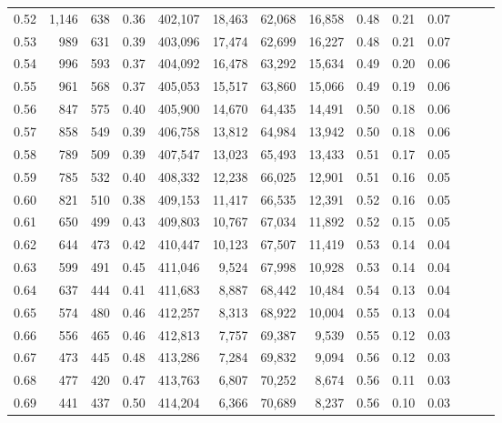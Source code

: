 \begin{tabular}{rrrrrrrrrrrrrr}
0.52 &   1,146 &    638 &  0.36 &  402,107 &   18,463 &  62,068 &  16,858 &  0.48 &  0.21 &      0.07 \\
0.53 &     989 &    631 &  0.39 &  403,096 &   17,474 &  62,699 &  16,227 &  0.48 &  0.21 &      0.07 \\
0.54 &     996 &    593 &  0.37 &  404,092 &   16,478 &  63,292 &  15,634 &  0.49 &  0.20 &      0.06 \\
0.55 &     961 &    568 &  0.37 &  405,053 &   15,517 &  63,860 &  15,066 &  0.49 &  0.19 &      0.06 \\
0.56 &     847 &    575 &  0.40 &  405,900 &   14,670 &  64,435 &  14,491 &  0.50 &  0.18 &      0.06 \\
0.57 &     858 &    549 &  0.39 &  406,758 &   13,812 &  64,984 &  13,942 &  0.50 &  0.18 &      0.06 \\
0.58 &     789 &    509 &  0.39 &  407,547 &   13,023 &  65,493 &  13,433 &  0.51 &  0.17 &      0.05 \\
0.59 &     785 &    532 &  0.40 &  408,332 &   12,238 &  66,025 &  12,901 &  0.51 &  0.16 &      0.05 \\
0.60 &     821 &    510 &  0.38 &  409,153 &   11,417 &  66,535 &  12,391 &  0.52 &  0.16 &      0.05 \\
0.61 &     650 &    499 &  0.43 &  409,803 &   10,767 &  67,034 &  11,892 &  0.52 &  0.15 &      0.05 \\
0.62 &     644 &    473 &  0.42 &  410,447 &   10,123 &  67,507 &  11,419 &  0.53 &  0.14 &      0.04 \\
0.63 &     599 &    491 &  0.45 &  411,046 &    9,524 &  67,998 &  10,928 &  0.53 &  0.14 &      0.04 \\
0.64 &     637 &    444 &  0.41 &  411,683 &    8,887 &  68,442 &  10,484 &  0.54 &  0.13 &      0.04 \\
0.65 &     574 &    480 &  0.46 &  412,257 &    8,313 &  68,922 &  10,004 &  0.55 &  0.13 &      0.04 \\
0.66 &     556 &    465 &  0.46 &  412,813 &    7,757 &  69,387 &   9,539 &  0.55 &  0.12 &      0.03 \\
0.67 &     473 &    445 &  0.48 &  413,286 &    7,284 &  69,832 &   9,094 &  0.56 &  0.12 &      0.03 \\
0.68 &     477 &    420 &  0.47 &  413,763 &    6,807 &  70,252 &   8,674 &  0.56 &  0.11 &      0.03 \\
0.69 &     441 &    437 &  0.50 &  414,204 &    6,366 &  70,689 &   8,237 &  0.56 &  0.10 &      0.03 \\

\end{tabular}
